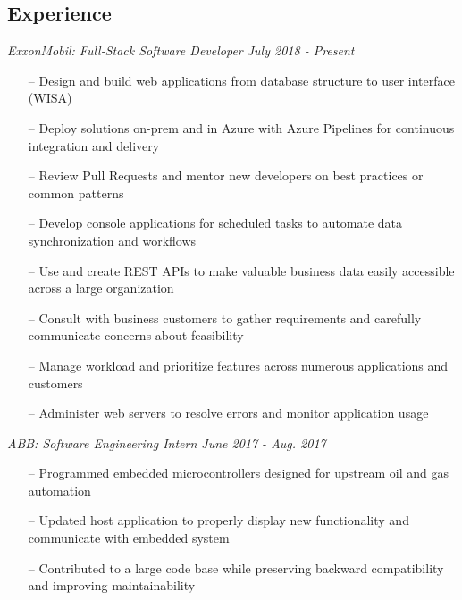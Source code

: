 \documentclass[line,overlapped,9pt]{res}
\begin{document}
\setlength\itemsep{.25em}
\address{Email: kllinzy1@gmail.com}
\address{Mobile: (918)440-3563}

\begin{resume}

  \section{Experience} {\sl ExxonMobil: Full-Stack Software Developer \hfill July 2018 - \sl Present}
                 \begin{itemize}   %
                 \item[--] Design and build web applications from database structure to user interface (WISA)
                 \item[--] Deploy solutions on-prem and in Azure with Azure Pipelines for continuous integration
                   and delivery
                 \item[--] Review Pull Requests and mentor new developers on best practices or common patterns
                 \item[--] Develop console applications for scheduled tasks to automate data synchronization
                   and workflows
                 \item[--] Use and create REST APIs to make valuable business data easily accessible across
                   a large organization 
                 \item[--] Consult with business customers to gather requirements and carefully communicate
                   concerns about feasibility
                 \item[--] Manage workload and prioritize features across numerous applications and customers
                \item[--] Administer web servers to resolve errors and monitor application usage
                 \end{itemize}
                 
                 {\sl ABB: Software Engineering Intern  \hfill June 2017 - Aug. 2017 }
                 \begin{itemize}  %
                 \item[--] Programmed embedded microcontrollers designed for upstream
                   oil and gas automation 
                 \item[--] Updated host application to properly display new functionality and
                   communicate with embedded system
                 \item[--] Contributed to a large code base while preserving 
                   backward compatibility and improving maintainability
                 \end{itemize} 


\end{resume}
\end{document}
